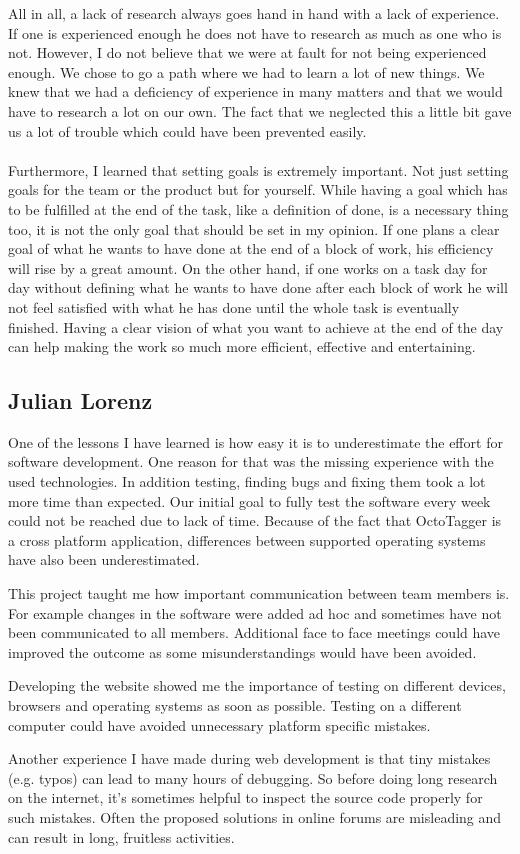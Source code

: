 All in all, a lack of research always goes hand in hand with a lack of
experience. If one is experienced enough he does not have to research as much as
one who is not. However, I do not believe that we were at fault for not being
experienced enough. We chose to go a path where we had to learn a lot
of new things. We knew that we had a deficiency of experience in many matters
and that we would have to research a lot on our own. The fact that we neglected
this a little bit gave us a lot of trouble which could have been prevented
easily.

\paragraph{}
Furthermore, I learned that setting goals is extremely important. Not just
setting goals for the team or the product but for yourself. While having a goal
which has to be fulfilled at the end of the task, like a definition of done, is
a necessary thing too, it is not the only goal that should be set in my opinion.
If one plans a clear goal of what he wants to have done at the end of a block of
work, his efficiency will rise by a great amount. On the other hand, if one
works on a task day for day without defining what he wants to have done after each
block of work he will not feel satisfied with what he has done until the whole
task is eventually finished. Having a clear vision of what you want to achieve
at the end of the day can help making the work so much more efficient, effective
and entertaining.

\subsection{Julian Lorenz}

One of the lessons I have learned is how easy it is to underestimate the effort
for software development. One reason for that was the missing experience with
the used technologies. In addition testing, finding bugs and fixing them took a
lot more time than expected. Our initial goal to fully test the software every
week could not be reached due to lack of time. Because of the fact that
OctoTagger is a cross platform application, differences between supported
operating systems have also been underestimated.

This project taught me how important communication between team members is. For
example changes in the software were added ad hoc and sometimes have not been
communicated to all members. Additional face to face meetings could have
improved the outcome as some misunderstandings would have been avoided.

Developing the website showed me the importance of testing on
different devices, browsers and operating systems as soon as possible. Testing
on a different computer could have avoided unnecessary platform specific
mistakes.

Another experience I have made during web development is that tiny mistakes
(e.g. typos) can lead to many hours of debugging. So before doing long
research on the internet, it's sometimes helpful to inspect the source code
properly for such mistakes. Often the proposed solutions in online forums
are misleading and can result in long, fruitless activities.
